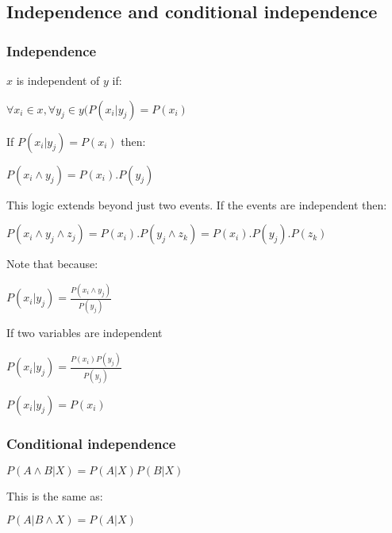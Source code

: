 
\subsection{Independence and conditional independence}

\subsubsection{Independence}

\(x\) is independent of \(y\) if:

$\forall x_i \in x,\forall y_j \in y (P(x_i|y_j)=P(x_i)$

If \(P(x_i|y_j)=P(x_i)\) then:

$P(x_i\land y_j)=P(x_i).P(y_j)$

This logic extends beyond just two events. If the events are independent then:

$P(x_i\land y_j \land z_j)=P(x_i).P(y_j \land z_k)=P(x_i).P(y_j).P(z_k)$

Note that because:

$P(x_i|y_j)=\frac{P(x_i\land y_j)}{P(y_j)}$

If two variables are independent

$P(x_i|y_j)=\frac{P(x_i)P(y_j)}{P(y_j)}$

$P(x_i|y_j)=P(x_i)$

\subsubsection{Conditional independence}

\(P(A\land B|X)=P(A|X)P(B|X)\)

This is the same as:

\(P(A|B\land X)=P(A|X)\)

